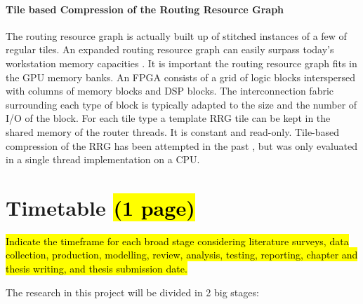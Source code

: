 \documentclass[a4paper,oneside,12pt]{article}
\begin{document}
\paragraph{Tile based Compression of the Routing Resource Graph}
The routing resource graph is actually built up of stitched instances of a few of regular tiles. An expanded routing resource graph can easily surpass today's workstation memory capacities \cite{murray2015timing}. It is important the routing resource graph fits in the GPU memory banks.
An FPGA consists of a grid of logic blocks interspersed with columns of memory blocks and DSP blocks. The interconnection fabric surrounding each type of block is typically adapted to the size and the number of I/O of the block. For each tile type a template RRG tile can be kept in the shared memory of the router threads. It is constant and read-only.
Tile-based compression of the RRG has been attempted in the past \cite{chin2007memory}, but was only evaluated in a single thread implementation on a CPU.


\newpage

\section{Timetable \hl{(1 page)}}\label{timetable}
\hl{ Indicate the timeframe for each broad stage considering literature surveys, data collection, production, modelling, review, analysis,
testing, reporting, chapter and thesis writing, and thesis submission date.}

The research in this project will be divided in 2 big stages:
\end{document}
